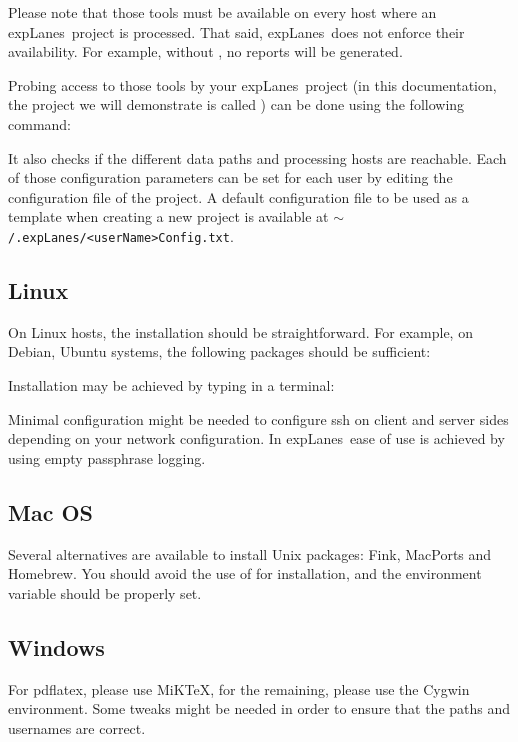 \documentclass[a4paper,fleqn]{tufte-handout}
\newcommand{\explanes}{\textsf{expLanes}\ }
\begin{document}
Please note that those tools must be available on every host where an \explanes project is processed. That said, \explanes does not enforce their availability. For example, without , no reports will be generated.

Probing access to those tools by your \explanes project (in this documentation, the project we will demonstrate is called ) can be done using the following command:


It also checks if the different data paths and processing hosts are reachable. Each of those configuration parameters can be set for each user by editing the configuration file of the project. A default configuration file to be used as a template when creating a new project is available at \texttt{$\sim$/.expLanes/<userName>Config.txt}.

\subsection{Linux}

On Linux hosts, the installation should be straightforward. For example, on Debian, Ubuntu systems, the following packages should be sufficient:


Installation may be achieved by typing in a terminal: 


Minimal configuration might be needed to configure ssh on client and server sides depending on your network configuration. In \explanes ease of use is achieved by using empty passphrase logging.

\subsection{Mac OS}

Several alternatives are available to install Unix packages: Fink, MacPorts and Homebrew. You should avoid the use of  for installation, and the  environment variable should be properly set.

\subsection{Windows}

For pdflatex, please use MiKTeX, for the remaining, please use the Cygwin environment. Some tweaks might be needed in order to ensure that the paths and usernames are correct.
\end{document}
